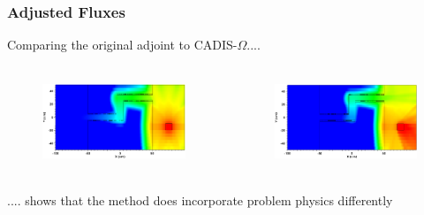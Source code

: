 \documentclass[handout]{beamer}
\renewcommand{\(}{\begin{columns}}
\renewcommand{\)}{\end{columns}}
\newcommand{\<}[1]{\begin{column}{#1}}
\renewcommand{\>}{\end{column}}
\begin{document}

\begin{frame}[fragile]
  \frametitle{Adjusted Fluxes}


	Comparing the original adjoint to CADIS-$\Omega$....
	\vspace*{1 em}
	\begin{columns}
  	\begin{column}{0.5\textwidth}
  	\begin{figure}
  	\begin{center}
  		\includegraphics[height=1in,clip]{maze2_adjoint_group26_adjusted_cropped.png}
	\end{center}
  	\end{figure}
  	\end{column}
 	\begin{column}{0.5\textwidth}
 	\begin{figure}
  	\begin{center}
  		\includegraphics[height=1in,clip]{maze2_myflux_group26_adjusted_cropped.png}
  	\end{center}
  	\end{figure}
  	\end{column}
	\end{columns}
	\vspace*{1 em}
	.... shows that the method does incorporate problem physics differently
  
	
\end{frame}
\end{document}
